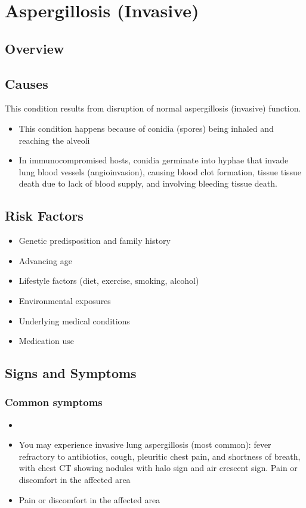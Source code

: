 \chapter{Aspergillosis (Invasive)}
\label{sec:Aspergillosis Invasive}

\section{Overview}

\section{Causes}
This condition results from disruption of normal aspergillosis (invasive) function.

\begin{itemize}[noitemsep]
  \item This condition happens because of conidia (spores) being inhaled and reaching the alveoli
  \item In immunocompromised hosts, conidia germinate into hyphae that invade lung blood vessels (angioinvasion), causing blood clot formation, tissue tissue death due to lack of blood supply, and involving bleeding tissue death.
\end{itemize}
\section{Risk Factors}


\begin{itemize}[noitemsep]
  \item Genetic predisposition and family history
  \item Advancing age
  \item Lifestyle factors (diet, exercise, smoking, alcohol)
  \item Environmental exposures
  \item Underlying medical conditions
  \item Medication use
\end{itemize}
\section{Signs and Symptoms}

\subsection{Common symptoms}
\begin{itemize}[noitemsep]
  \item \item You may experience invasive lung aspergillosis (most common): fever refractory to antibiotics, cough, pleuritic chest pain, and shortness of breath, with chest CT showing nodules with halo sign and air crescent sign. Pain or discomfort in the affected area    \item Pain or discomfort in the affected area
  \end{itemize}

